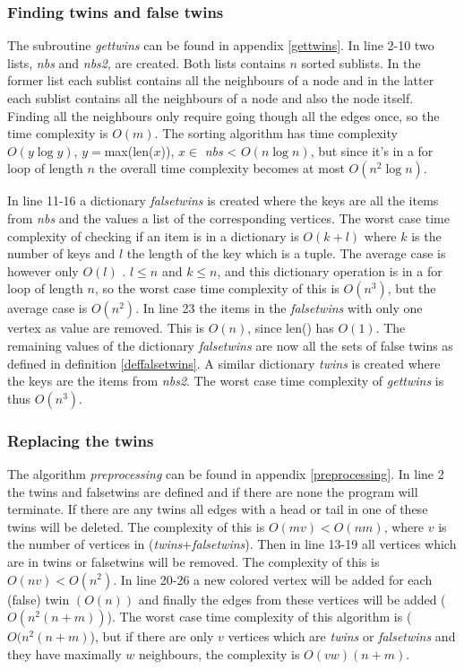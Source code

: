 \documentclass[twoside]{article}
\theoremstyle{definition}
\theoremstyle{plain}
\begin{document}
\begin{multicols}{2}
\subsubsection{Finding twins and false twins}
The subroutine \emph{gettwins} can be found in appendix \ref{gettwins}. In line 2-10 two lists, \emph{nbs} and \emph{nbs2}, are created. Both lists contains $n$ sorted sublists. In the former list each sublist contains all the neighbours of a node and in the latter each sublist contains all the neighbours of a node and also the node itself. Finding all the neighbours only require going though all the edges once, so the time complexity is $O(m)$. The sorting algorithm has time complexity $O(y \log y)$, $y=$max(len($x$)), $x \in $ \emph{nbs} < $O(n \log n)$, but since it's in a for loop of length $n$ the overall time complexity becomes at most $O(n^2 \log n)$. 

In line 11-16 a dictionary \emph{falsetwins} is created where the keys are all the items from \emph{nbs} and the values a list of the corresponding vertices. The worst case time complexity of checking if an item is in a dictionary is $O(k+l)$ where $k$ is the number of keys and $l$ the length of the key which is a tuple. The average case is however only $O(l)$ \cite{website:pythonTimeComplexity}.  $l\leq n$ and $k\leq n$, and this dictionary operation is in a for loop of length $n$, so the worst case time complexity of this is $O(n^3)$, but the average case is $O(n^2)$. In line 23 the items in the \emph{falsetwins} with only one vertex as value are removed. This is $O(n)$, since len() has $O(1)$.\cite{website:pythonTimeComplexity} The remaining values of the dictionary \emph{falsetwins} are now all the sets of false twins as defined in definition \ref{deffalsetwins}. A similar dictionary \emph{twins} is created where the keys are the items from \emph{nbs2}. The worst case time complexity of \textit{gettwins} is thus $O(n^3)$.


\subsubsection{Replacing the twins}
The algorithm \emph{preprocessing} can be found in appendix \ref{preprocessing}. In line 2 the twins and falsetwins are defined and if there are none the program will terminate. If there are any twins all edges with a head or tail in one of these twins will be deleted. The complexity of this is $O(mv) < O (nm)$, where $v$ is the number of vertices in (\emph{twins}+\emph{falsetwins}). Then in line 13-19 all vertices which are in twins or falsetwins will be removed. The complexity of this is $O(nv) < O(n^2)$. In line 20-26 a new colored vertex will be added for each (false) twin $(O(n))$ and finally the edges from these vertices will be added ($O(n^2 (n+m))$). The worst case time complexity of this algorithm is ($O(n^2 (n+m)$), but if there are only $v$ vertices which are \emph{twins} or \emph{falsetwins} and they have maximally $w$ neighbours, the complexity is $O(vw) (n+m)$.


\end{multicols}
\end{document}
